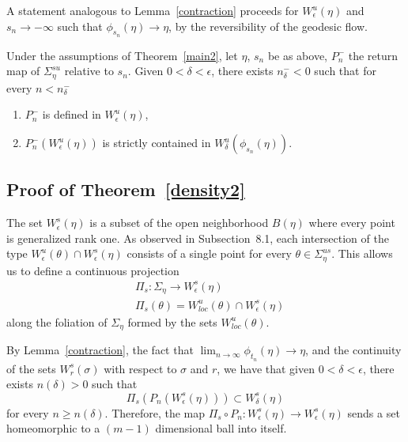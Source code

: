 \documentclass[AHL,Unicode,longabstracts,published]{cedram}
\begin{document}
A statement analogous to Lemma~\ref{contraction} proceeds for $W^{u}_{\epsilon}(\eta)$ and $s_{n} \rightarrow -\infty$ such that $\phi_{s_{n}}(\eta) \rightarrow \eta$, by the reversibility of the geodesic flow.

\begin{lemm}\label{contraction2}
Under the assumptions of Theorem~\ref{main2}, let $\eta$, $s_{n}$ be as above, $P_{n}^{-}$ the return map of $\Sigma_{\eta}^{su}$ relative to $s_{n}$. Given $0 <\delta <\epsilon$, there exists $n_{\delta}^{-}<0$ such that for every $n <n_{\delta}^{-}$
\begin{enumerate}
\item \label{lemm8.4.1}$P_{n}^{-}$ is defined in $W^{u}_{\epsilon}(\eta)$,
\item \label{lemm8.4.2}$P_{n}^{-}(W^{u}_{\epsilon}(\eta))$ is strictly contained in $W^{u}_{\delta}(\phi_{s_{n}}(\eta)).$
\end{enumerate}
\end{lemm}


\subsection{Proof of Theorem~\ref{density2}}

The set $W^{s}_{\epsilon}(\eta)$ is a subset of the open neighborhood $B(\eta)$ where every point is generalized rank one. As observed in Subsection~8.1, each intersection of the type $W^{u}_{\epsilon} (\theta) \cap W^{s}_{\epsilon}(\eta)$ consists of a single point for every $\theta \in \Sigma_{\eta}^{us}$. This allows us to define a continuous projection
\begin{align*}
&\Pi_{s} : \Sigma_{\eta} \longrightarrow W^{s}_{\epsilon}(\eta)
\\
&\Pi_{s}(\theta) = W^{u}_{loc} (\theta) \cap W^{s}_{\epsilon}(\eta)
\end{align*}
along the foliation of $\Sigma_{\eta}$ formed by the sets $W^{u}_{loc}(\theta)$.


By Lemma~\ref{contraction}, the fact that $\lim_{n\rightarrow \infty}\phi_{t_{n}}(\eta) \rightarrow \eta$, and the continuity of the sets $W^{s}_{r}(\sigma)$ with respect to $\sigma$ and $r$, we have that given $0 < \delta <\epsilon$, there exists $ n(\delta)>0$ such that
\[
\Pi_{s}\left(P_{n}\left(W^{s}_{\epsilon}(\eta)\right)\right) \subset W^{s}_{\delta}(\eta)
\]
for every $ n \geq n(\delta)$. Therefore, the map $\Pi_{s} \circ P_{n} : W^{s}_{\epsilon}(\eta) \longrightarrow W^{s}_{\epsilon}(\eta)$ sends a set homeomorphic to a $(m-1)$ dimensional ball into itself.
\end{document}
